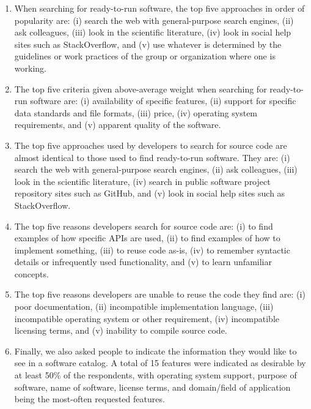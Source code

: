 \documentclass{casicswhitepaper}
\begin{document}
\begin{enumerate}

\item When searching for ready-to-run software, the top five approaches in order of popularity are: (i) search the web with general-purpose search engines, (ii) ask colleagues, (iii) look in the scientific literature, (iv) look in social help sites such as StackOverflow, and (v) use whatever is determined by the guidelines or work practices of the group or organization where one is working.

\item The top five criteria given above-average weight when searching for ready-to-run software are: (i) availability of specific features, (ii) support for specific data standards and file formats, (iii) price, (iv) operating system requirements, and (v) apparent quality of the software.

\item The top five approaches used by developers to search for source code are almost identical to those used to find ready-to-run software.  They are: (i) search the web with general-purpose search engines, (ii) ask colleagues, (iii) look in the scientific literature, (iv) search in public software project repository sites such as GitHub, and (v) look in social help sites such as StackOverflow.

\item The top five reasons developers search for source code are: (i) to find examples of how specific APIs are used, (ii) to find examples of how to implement something, (iii) to reuse code as-is, (iv) to remember syntactic details or infrequently used functionality, and (v) to learn unfamiliar concepts.

\item The top five reasons developers are unable to reuse the code they find are: (i) poor documentation, (ii) incompatible implementation language, (iii) incompatible operating system or other requirement, (iv) incompatible licensing terms, and (v) inability to compile source code.

\item Finally, we also asked people to indicate the information they would like to see in a software catalog.  A total of 15 features were indicated as desirable by at least 50\% of the respondents, with operating system support, purpose of software, name of software, license terms, and domain/field of application being the most-often requested features.

\end{enumerate}
\end{document}
